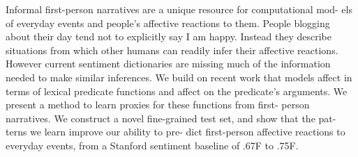 Informal first-person narratives are a unique resource for computational mod- els of everyday events and people's affective reactions to them. People blogging about their day tend not to explicitly say I am happy. Instead they describe situations from which other humans can readily infer their affective reactions. However current sentiment dictionaries are missing much of the information needed to make similar inferences. We build on recent work that models affect in terms of lexical predicate functions and affect on the predicate's arguments. We present a method to learn proxies for these functions from first- person narratives. We construct a novel fine-grained test set, and show that the pat- terns we learn improve our ability to pre- dict first-person affective reactions to everyday events, from a Stanford sentiment baseline of .67F to .75F.
